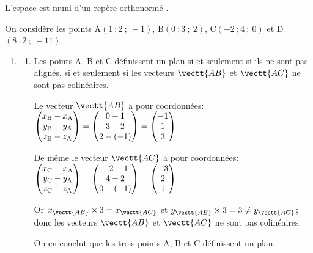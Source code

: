 L'espace est muni d'un repère orthonormé \Oij.

On considère les points A$(1~;2~;~-1)$, B$(0~;3~;~2)$, C$(-2~;4~;~0)$ et D$(8~;2~;~-11)$.

\begin{enumerate}
\item
\begin{enumerate}[label=\textbf{\alph*.}]
\item %
Les points A, B et C définissent un plan si et seulement si ils ne sont pas alignés, si et seulement si les vecteurs $\vectt{AB}$ et $\vectt{AC}$ ne sont pas colinéaires.

Le vecteur $\vectt{AB}$ a pour coordonnées: 
$\begin{pmatrix}
x_{\text B} - x_{\text A} \\ y_{\text B} - y_{\text A} \\ z_{\text B} - z_{\text A}
\end{pmatrix}
=
\begin{pmatrix}
0 - 1 \\ 3-2 \\ 2-(-1) 
\end{pmatrix}
=
\begin{pmatrix}
-1 \\ 1 \\3
\end{pmatrix}$

De même le vecteur $\vectt{AC}$ a pour coordonnées: 
$\begin{pmatrix}
x_{\text C} - x_{\text A} \\ y_{\text C} - y_{\text A} \\ z_{\text C} - z_{\text A}
\end{pmatrix}
=
\begin{pmatrix}
-2-1 \\ 4-2 \\ 0-(-1)
\end{pmatrix}
=
\begin{pmatrix}
-3 \\ 2 \\ 1
\end{pmatrix}$

Or $x_{\vectt{AB}} \times 3 = x_{\vectt{AC}}$ et $y_{\vectt{AB}} \times 3 = 3 \neq y_{\vectt{AC}}$; donc les vecteurs $\vectt{AB}$ et $\vectt{AC}$ ne sont pas colinéaires.

On en conclut que les trois points A, B et C définissent un plan.  


\end{enumerate}
\end{enumerate}

